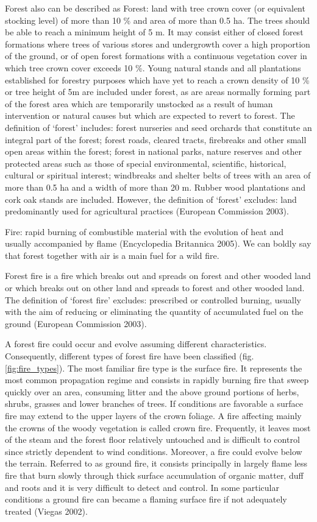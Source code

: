 {{{	Forest also can be described as Forest: land with tree crown cover (or equivalent stocking level) of more than 10 \% and area of more than 0.5 ha. The trees should be able to reach a minimum height of 5 m. It may consist either of closed forest formations where trees of various stores and undergrowth cover a high proportion of the ground, or of open forest formations with a continuous vegetation cover in which tree crown cover exceeds 10 \%. Young natural stands and all plantations established for forestry purposes which have yet to reach a crown density of 10 \% or tree height of 5m are included under forest, as are areas normally forming part of the forest area which are temporarily unstocked as a result of human intervention or natural causes but which are expected to revert to forest. The definition of ‘forest’ includes: forest nurseries and seed orchards that constitute an integral part of the forest; forest roads, cleared tracts, firebreaks and other small open areas within the forest; forest in national parks, nature reserves and other protected areas such as those of special environmental, scientific, historical, cultural or spiritual interest; windbreaks and shelter belts of trees with an area of more than 0.5 ha and a width of more than 20 m. Rubber wood plantations and cork oak stands are included. However, the definition of ‘forest’ excludes: land predominantly used for agricultural practices (European Commission 2003).
	
	Fire: rapid burning of combustible material with the evolution of heat and usually accompanied by flame (Encyclopedia Britannica 2005). We can boldly say that forest together with air is a main fuel for a wild fire.
	
	Forest fire is a fire which breaks out and spreads on forest and other wooded land or which breaks out on other land and spreads to forest and other wooded land. The definition of ‘forest fire’ excludes: prescribed or controlled burning, usually with the aim of reducing or eliminating the quantity of accumulated fuel on the ground (European Commission 2003).
	
	A forest fire could occur and evolve assuming different characteristics. Consequently, different types of forest fire have been classified (fig. \ref{fig:fire_types}). The most familiar fire type is the surface fire. It represents the most common propagation regime and consists in rapidly burning fire that sweep quickly over an area, consuming litter and the above ground portions of herbs, shrubs, grasses and lower branches of trees. If conditions are favorable a surface fire may extend to the upper layers of the crown foliage. A fire affecting mainly the crowns of the woody vegetation is called crown fire. Frequently, it leaves most of the steam and the forest floor relatively untouched and is difficult to control since strictly dependent to wind conditions. Moreover, a fire could evolve below the terrain. Referred to as ground fire, it consists principally in largely flame less fire that burn slowly through thick surface accumulation of organic matter, duff and roots and it is very difficult to detect and control. In some particular conditions a ground fire can became a flaming surface fire if not adequately treated (Viegas 2002).

}}}
